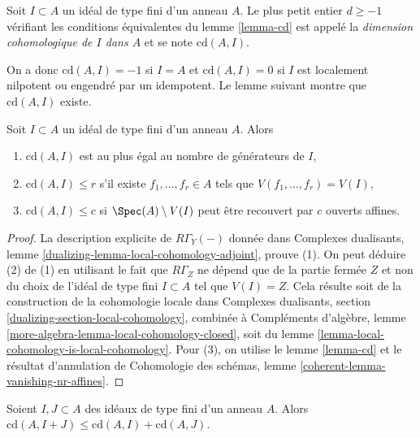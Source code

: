 \begin{definition}
\label{definition-cd}
Soit $I \subset A$ un idéal de type fini d'un anneau $A$. Le plus petit entier $d \geq -1$ vérifiant les conditions équivalentes du lemme \ref{lemma-cd} est appelé la {\it dimension cohomologique de $I$ dans $A$} et se note $\text{cd}(A, I)$.
\end{definition}

\noindent
On a donc $\text{cd}(A, I) = -1$ si $I = A$ et $\text{cd}(A, I) = 0$ si $I$ est localement nilpotent ou engendré par un idempotent. Le lemme suivant montre que $\text{cd}(A, I)$ existe.

\begin{lemma}
\label{lemma-bound-cd}
Soit $I \subset A$ un idéal de type fini d'un anneau $A$. Alors
\begin{enumerate}
\item $\text{cd}(A, I)$ est au plus égal au nombre de générateurs de $I$,
\item $\text{cd}(A, I) \leq r$ s'il existe $f_1, \ldots, f_r \in A$ tels que $V(f_1, \ldots, f_r) = V(I)$,
\item $\text{cd}(A, I) \leq c$ si $\Spec(A) \setminus V(I)$ peut être recouvert par $c$ ouverts affines.
\end{enumerate}
\end{lemma}

\begin{proof}
La description explicite de $R\Gamma_Y(-)$ donnée dans Complexes dualisants, lemme \ref{dualizing-lemma-local-cohomology-adjoint}, prouve (1). On peut déduire (2) de (1) en utilisant le fait que $R\Gamma_Z$ ne dépend que de la partie fermée $Z$ et non du choix de l'idéal de type fini $I \subset A$ tel que $V(I) = Z$. Cela résulte soit de la construction de la cohomologie locale dans Complexes dualisants, section \ref{dualizing-section-local-cohomology}, combinée à Compléments d'algèbre, lemme \ref{more-algebra-lemma-local-cohomology-closed}, soit du lemme \ref{lemma-local-cohomology-is-local-cohomology}. Pour (3), on utilise le lemme \ref{lemma-cd} et le résultat d'annulation de Cohomologie des schémas, lemme \ref{coherent-lemma-vanishing-nr-affines}.
\end{proof}

\begin{lemma}
\label{lemma-cd-sum}
Soient $I, J \subset A$ des idéaux de type fini d'un anneau $A$. Alors $\text{cd}(A, I + J) \leq \text{cd}(A, I) + \text{cd}(A, J)$.
\end{lemma}

